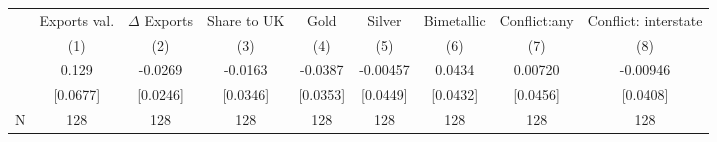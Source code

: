 {
\def\sym#1{\ifmmode^{#1}\else\(^{#1}\)\fi}
\begin{tabular}{l*{8}{c}}
\toprule
            &\multicolumn{1}{c}{Exports val.}&\multicolumn{1}{c}{$\Delta$ Exports}&\multicolumn{1}{c}{Share to UK}&\multicolumn{1}{c}{Gold}&\multicolumn{1}{c}{Silver}&\multicolumn{1}{c}{Bimetallic}&\multicolumn{1}{c}{Conflict:any}&\multicolumn{1}{c}{Conflict: interstate}\\\cmidrule(lr){2-2}\cmidrule(lr){3-3}\cmidrule(lr){4-4}\cmidrule(lr){5-5}\cmidrule(lr){6-6}\cmidrule(lr){7-7}\cmidrule(lr){8-8}\cmidrule(lr){9-9}
            &\multicolumn{1}{c}{(1)}   &\multicolumn{1}{c}{(2)}   &\multicolumn{1}{c}{(3)}   &\multicolumn{1}{c}{(4)}   &\multicolumn{1}{c}{(5)}   &\multicolumn{1}{c}{(6)}   &\multicolumn{1}{c}{(7)}   &\multicolumn{1}{c}{(8)}   \\
\midrule
{}          &       0.129   &     -0.0269   &     -0.0163   &     -0.0387   &    -0.00457   &      0.0434   &     0.00720   &    -0.00946   \\
            &    [0.0677]   &    [0.0246]   &    [0.0346]   &    [0.0353]   &    [0.0449]   &    [0.0432]   &    [0.0456]   &    [0.0408]   \\
\midrule
N           &         128   &         128   &         128   &         128   &         128   &         128   &         128   &         128   \\
\bottomrule
\end{tabular}
}
